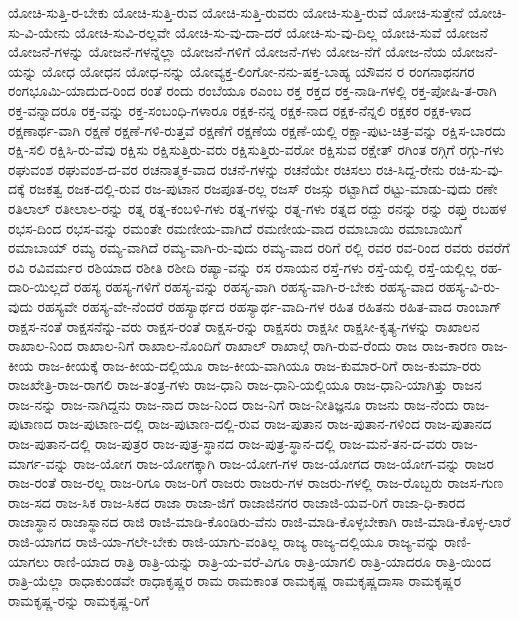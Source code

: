 {ಯೋಚಿ-ಸುತ್ತಿ-ರ-ಬೇಕು
ಯೋಚಿ-ಸುತ್ತಿ-ರುವ
ಯೋಚಿ-ಸುತ್ತಿ-ರುವರು
ಯೋಚಿ-ಸುತ್ತಿ-ರುವೆ
ಯೋಚಿ-ಸುತ್ತೇನೆ
ಯೋಚಿ-ಸು-ವಿ-ಯೇನು
ಯೋಚಿ-ಸುವಿ-ರಲ್ಲವೇ
ಯೋಚಿ-ಸು-ವು-ದಾ-ದರೆ
ಯೋಚಿ-ಸು-ವು-ದಿಲ್ಲ
ಯೋಚಿ-ಸುವೆ
ಯೋಜನೆ
ಯೋಜನೆ-ಗಳನ್ನು
ಯೋಜನೆ-ಗಳನ್ನೆಲ್ಲಾ
ಯೋಜನೆ-ಗಳಿಗೆ
ಯೋಜನೆ-ಗಳು
ಯೋಜ-ನೆಗೆ
ಯೋಜ-ನೆಯ
ಯೋಜನೆ-ಯನ್ನು
ಯೋಧ
ಯೋಧನ
ಯೋಧ-ನನ್ನು
ಯೋವ್ಯಕ್ತ-ಲಿಂಗೋ-ನನು-ಷಕ್ತ-ಬಾಹ್ಯ
ಯೌವನ
ರ
ರಂಗನಾಥನಗರ
ರಂಗಭೂಮಿ-ಯಾದುದ-ರಿಂದ
ರಂತೆ
ರಂದು
ರಂಬೆಯೂ
ರಎಂಬ
ರಕ್ತ
ರಕ್ತದ
ರಕ್ತ-ನಾಡಿ-ಗಳಲ್ಲಿ
ರಕ್ತ-ಪೋಷಿ-ತ-ರಾಗಿ
ರಕ್ತ-ವನ್ನಾದರೂ
ರಕ್ತ-ವನ್ನು
ರಕ್ತ-ಸಂಬಂಧಿ-ಗಳಾರೂ
ರಕ್ಷಕ-ನನ್ನ
ರಕ್ಷಕ-ನಾದ
ರಕ್ಷಕ-ನೆನ್ನಲಿ
ರಕ್ಷಕರ
ರಕ್ಷಕ-ಳಾದ
ರಕ್ಷಣಾರ್ಥ-ವಾಗಿ
ರಕ್ಷಣೆ
ರಕ್ಷಣೆ-ಗಳಿ-ರುತ್ತವೆ
ರಕ್ಷಣೆಗೆ
ರಕ್ಷಣೆಯ
ರಕ್ಷಣೆ-ಯಲ್ಲಿ
ರಕ್ಷಾ-ಪುಟ-ಚಿತ್ರ-ವನ್ನು
ರಕ್ಷಿಸ-ಬಾರದು
ರಕ್ಷಿ-ಸಲಿ
ರಕ್ಷಿಸಿ-ರು-ವೆವು
ರಕ್ಷಿಸು
ರಕ್ಷಿಸುತ್ತಿರು-ವರು
ರಕ್ಷಿಸುತ್ತಿರು-ವರೋ
ರಕ್ಷಿಸುವ
ರಕ್ಷೇತ್
ರಗಿಂತ
ರಗ್ಗಿಗೆ
ರಗ್ಗು-ಗಳು
ರಘುವಂಶ
ರಘುವಂಶ-ದ-ವರ
ರಚನಾತ್ಮಕ-ವಾದ
ರಚನೆ-ಗಳನ್ನು
ರಚನೆಯೇ
ರಚಿಸಲು
ರಚಿ-ಸಿದ್ದ-ರೇನು
ರಚಿ-ಸು-ವು-ದಕ್ಕೆ
ರಜಕತ್ವ
ರಜಕ-ದಲ್ಲಿ-ರುವ
ರಜ-ಪುಟಾನ
ರಜಪೂತ-ರಲ್ಲ
ರಜಸ್
ರಜಸ್ಸು
ರಟ್ಟಾಗಿದೆ
ರಟ್ಟು-ಮಾಡು-ವುದು
ರಣೇ
ರತಿಲಾಲ್
ರತೀಲಾಲ-ರನ್ನು
ರತ್ನ
ರತ್ನ-ಕಂಬಳಿ-ಗಳು
ರತ್ನ-ಗಳನ್ನು
ರತ್ನ-ಗಳು
ರತ್ನದ
ರದ್ದು
ರನನ್ನು
ರನ್ನು
ರಫ್ತು
ರಬಹಳ
ರಭಸ-ದಿಂದ
ರಭಸ-ವನ್ನು
ರಮಂತೇ
ರಮಣೀಯ-ವಾಗಿದೆ
ರಮಣೀಯ-ವಾದ
ರಮಾಬಾಯಿ
ರಮಾಬಾಯಿಗೆ
ರಮಾಬಾಯ್
ರಮ್ಯ
ರಮ್ಯ-ವಾಗಿದೆ
ರಮ್ಯ-ವಾಗಿ-ರು-ವುದು
ರಮ್ಯ-ವಾದ
ರರಿಗೆ
ರಲ್ಲಿ
ರವರ
ರವ-ರಿಂದ
ರವರು
ರವರೆಗೆ
ರವಿ
ರವಿವರ್ಮರ
ರಶಿಯಾದ
ರಶೀತಿ
ರಶೀದಿ
ರಷ್ಯಾ-ವನ್ನು
ರಸ
ರಸಾಯನ
ರಸ್ತೆ-ಗಳು
ರಸ್ತೆ-ಯಲ್ಲಿ
ರಸ್ತೆ-ಯಲ್ಲಿಲ್ಲ
ರಹ-ದಾರಿ-ಯಿಲ್ಲದೆ
ರಹಸ್ಯ
ರಹಸ್ಯ-ಗಳಿಗೆ
ರಹಸ್ಯ-ವನ್ನು
ರಹಸ್ಯ-ವಾಗಿ
ರಹಸ್ಯ-ವಾಗಿ-ರ-ಬೇಕು
ರಹಸ್ಯ-ವಾದ
ರಹಸ್ಯ-ವಿ-ರು-ವುದು
ರಹಸ್ಯವೇ
ರಹಸ್ಯ-ವೇ-ನೆಂದರೆ
ರಹಸ್ಯಾರ್ಥದ
ರಹಸ್ಯಾರ್ಥ-ವಾದಿ-ಗಳ
ರಹಿತ
ರಹಿತನು
ರಹಿತ-ವಾದ
ರಾಂಬಾಗ್
ರಾಕ್ಷಸ-ನಂತೆ
ರಾಕ್ಷಸನೆನ್ನು-ವರು
ರಾಕ್ಷಸ-ರಂತೆ
ರಾಕ್ಷಸ-ರನ್ನು
ರಾಕ್ಷಸರು
ರಾಕ್ಷಸೀ
ರಾಕ್ಷಸೀ-ಕೃತ್ಯ-ಗಳನ್ನು
ರಾಖಾಲನ
ರಾಖಾಲ-ನಿಂದ
ರಾಖಾಲ-ನಿಗೆ
ರಾಖಾಲ-ನೊಂದಿಗೆ
ರಾಖಾಲ್
ರಾಖಾಲ್ಗೆ
ರಾಗಿ-ರುವ-ರೆಂದು
ರಾಜ
ರಾಜ-ಕಾರಣ
ರಾಜ-ಕೀಯ
ರಾಜ-ಕೀಯಕ್ಕೆ
ರಾಜ-ಕೀಯ-ದಲ್ಲಿಯೂ
ರಾಜ-ಕೀಯ-ವಾಗಿಯೂ
ರಾಜ-ಕುಮಾರ-ರಿಗೆ
ರಾಜ-ಕುಮಾ-ರರು
ರಾಜಖೇತ್ರಿ-ರಾಜ-ರಾಗಲಿ
ರಾಜ-ತಂತ್ರ-ಗಳು
ರಾಜ-ಧಾನಿ
ರಾಜ-ಧಾನಿ-ಯಲ್ಲಿಯೂ
ರಾಜ-ಧಾನಿ-ಯಾಗಿತ್ತು
ರಾಜನ
ರಾಜ-ನನ್ನು
ರಾಜ-ನಾಗಿದ್ದನು
ರಾಜ-ನಾದ
ರಾಜ-ನಿಂದ
ರಾಜ-ನಿಗೆ
ರಾಜ-ನೀತಿಜ್ಞನೂ
ರಾಜನು
ರಾಜ-ನೆಂದು
ರಾಜ-ಪುಟಾಣದ
ರಾಜ-ಪುಟಾಣ-ದಲ್ಲಿ
ರಾಜ-ಪುಟಾಣ-ದಲ್ಲಿ-ರುವ
ರಾಜ-ಪುತಾನ
ರಾಜ-ಪುತಾನ-ಗಳಿಂದ
ರಾಜ-ಪುತಾನದ
ರಾಜ-ಪುತಾನ-ದಲ್ಲಿ
ರಾಜ-ಪುತ್ರರ
ರಾಜ-ಪುತ್ರ-ಸ್ಥಾನದ
ರಾಜ-ಪುತ್ರ-ಸ್ಥಾನ-ದಲ್ಲಿ
ರಾಜ-ಮನೆ-ತನ-ದ-ವರು
ರಾಜ-ಮಾರ್ಗ-ವನ್ನು
ರಾಜ-ಯೋಗ
ರಾಜ-ಯೋಗಕ್ಕಾಗಿ
ರಾಜ-ಯೋಗ-ಗಳ
ರಾಜ-ಯೋಗದ
ರಾಜ-ಯೋಗ-ವನ್ನು
ರಾಜರ
ರಾಜ-ರಂತೆ
ರಾಜ-ರಲ್ಲ
ರಾಜ-ರಿಗೂ
ರಾಜ-ರಿಗೆ
ರಾಜರು
ರಾಜರು-ಗಳ
ರಾಜರು-ಗಳಲ್ಲಿ
ರಾಜ-ರೊಬ್ಬರು
ರಾಜಸ-ಗುಣ
ರಾಜ-ಸದ
ರಾಜ-ಸಿಕ
ರಾಜ-ಸಿಕದ
ರಾಜಾ
ರಾಜಾ-ಜಿಗೆ
ರಾಜಾಜಿನಗರ
ರಾಜಾಜಿ-ಯವ-ರಿಗೆ
ರಾಜಾ-ಧಿ-ಕಾರದ
ರಾಜಾಸ್ಥಾನ
ರಾಜಾಸ್ಥಾನದ
ರಾಜಿ
ರಾಜಿ-ಮಾಡಿ-ಕೊಂಡಿರು-ವೆನು
ರಾಜಿ-ಮಾಡಿ-ಕೊಳ್ಳಬೇಕಾಗಿ
ರಾಜಿ-ಮಾಡಿ-ಕೊಳ್ಳ-ಲಾರೆ
ರಾಜಿ-ಯಾಗದ
ರಾಜಿ-ಯಾ-ಗಲೇ-ಬೇಕು
ರಾಜಿ-ಯಾಗು-ವಂತಿಲ್ಲ
ರಾಜ್ಯ
ರಾಜ್ಯ-ದಲ್ಲಿಯೂ
ರಾಜ್ಯ-ವನ್ನು
ರಾಣಿ-ಯಾಗಲು
ರಾಣಿ-ಯಾದ
ರಾತ್ರಿ
ರಾತ್ರಿ-ಯನ್ನು
ರಾತ್ರಿ-ಯ-ವರೆ-ವಿಗೂ
ರಾತ್ರಿ-ಯಾಗಲಿ
ರಾತ್ರಿ-ಯಾದರೂ
ರಾತ್ರಿ-ಯಿಂದ
ರಾತ್ರಿ-ಯೆಲ್ಲಾ
ರಾಧಾಕುಂಡವೇ
ರಾಧಾಕೃಷ್ಣರ
ರಾಮ
ರಾಮಕಾಂತ
ರಾಮಕೃಷ್ಣ
ರಾಮಕೃಷ್ಣದಾಸಾ
ರಾಮಕೃಷ್ಣರ
ರಾಮಕೃಷ್ಣ-ರನ್ನು
ರಾಮಕೃಷ್ಣ-ರಿಗೆ
}
